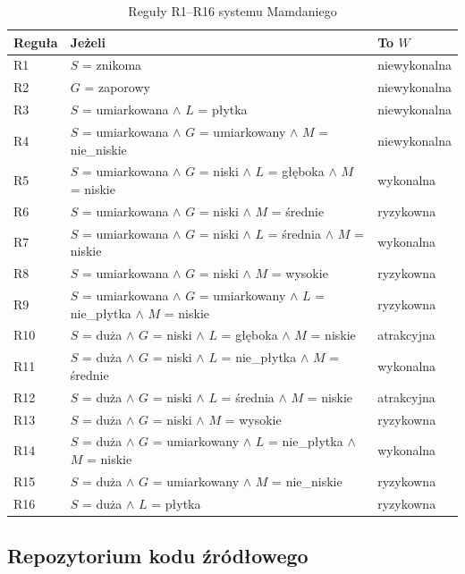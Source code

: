 \begin{table}[H]\centering\small
\caption{Reguły R1--R16 systemu Mamdaniego}\label{tab:rules}
\begin{tabular}{lll}
\toprule
Reguła & Jeżeli & To $W$ \\
\midrule
R1  & $S$ = znikoma & niewykonalna \\
R2  & $G$ = zaporowy & niewykonalna \\
R3  & $S$ = umiarkowana $\wedge$ $L$ = płytka & niewykonalna \\
R4  & $S$ = umiarkowana $\wedge$ $G$ = umiarkowany $\wedge$ $M$ = nie\_niskie & niewykonalna \\
R5  & $S$ = umiarkowana $\wedge$ $G$ = niski $\wedge$ $L$ = głęboka $\wedge$ $M$ = niskie & wykonalna \\
R6  & $S$ = umiarkowana $\wedge$ $G$ = niski $\wedge$ $M$ = średnie & ryzykowna \\
R7  & $S$ = umiarkowana $\wedge$ $G$ = niski $\wedge$ $L$ = średnia $\wedge$ $M$ = niskie & wykonalna \\
R8  & $S$ = umiarkowana $\wedge$ $G$ = niski $\wedge$ $M$ = wysokie & ryzykowna \\
R9  & $S$ = umiarkowana $\wedge$ $G$ = umiarkowany $\wedge$ $L$ = nie\_płytka $\wedge$ $M$ = niskie & ryzykowna \\
R10 & $S$ = duża $\wedge$ $G$ = niski $\wedge$ $L$ = głęboka $\wedge$ $M$ = niskie & atrakcyjna \\
R11 & $S$ = duża $\wedge$ $G$ = niski $\wedge$ $L$ = nie\_płytka $\wedge$ $M$ = średnie & wykonalna \\
R12 & $S$ = duża $\wedge$ $G$ = niski $\wedge$ $L$ = średnia $\wedge$ $M$ = niskie & atrakcyjna \\
R13 & $S$ = duża $\wedge$ $G$ = niski $\wedge$ $M$ = wysokie & ryzykowna \\
R14 & $S$ = duża $\wedge$ $G$ = umiarkowany $\wedge$ $L$ = nie\_płytka $\wedge$ $M$ = niskie & wykonalna \\
R15 & $S$ = duża $\wedge$ $G$ = umiarkowany $\wedge$ $M$ = nie\_niskie & ryzykowna \\
R16 & $S$ = duża $\wedge$ $L$ = płytka & ryzykowna \\
\bottomrule
\end{tabular}
\end{table}

\subsection{Repozytorium kodu źródłowego}

